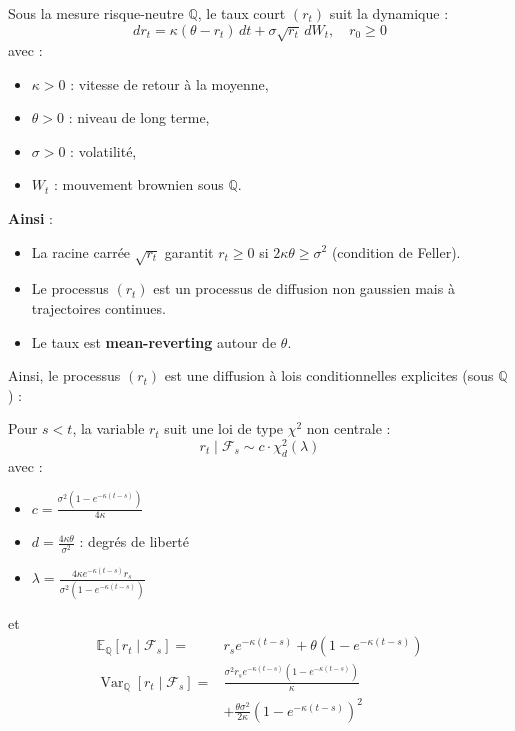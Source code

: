 \begin{f}
	
Sous la mesure risque-neutre $\mathbb{Q}$, le taux court $(r_t)$ suit la dynamique :
\[
dr_t = \kappa(\theta - r_t)\,dt + \sigma \sqrt{r_t}\, dW_t, \quad r_0 \geq 0
\]
avec :
\begin{itemize}[nosep]
	\item $\kappa > 0$ : vitesse de retour à la moyenne,
	\item $\theta > 0$ : niveau de long terme,
	\item $\sigma > 0$ : volatilité,
	\item $W_t$ : mouvement brownien sous $\mathbb{Q}$.
\end{itemize}

\textbf{Ainsi} :
\begin{itemize}
	\item La racine carrée $\sqrt{r_t}$ garantit $r_t \geq 0$ si $2\kappa\theta \geq \sigma^2$ (condition de Feller).
	\item Le processus $(r_t)$ est un processus de diffusion non gaussien mais à trajectoires continues.
	\item Le taux est \textbf{mean-reverting} autour de $\theta$.
\end{itemize}

Ainsi, le processus $(r_t)$ est une diffusion à lois conditionnelles explicites (sous $\mathbb{Q}$) :

Pour $s < t$, la variable $r_t$ suit une loi de type $\chi^2$ non centrale :
\[
r_t \mid \mathcal{F}_s \sim c \cdot \chi^2_{d}(\lambda)
\]
avec :
\begin{itemize}[nosep]
	\item $\displaystyle c = \frac{\sigma^2 (1 - e^{-\kappa (t - s)})}{4\kappa}$
	\item $\displaystyle d = \frac{4\kappa\theta}{\sigma^2}$ : degrés de liberté
	\item $\displaystyle \lambda = \frac{4\kappa e^{-\kappa (t - s)} r_s}{\sigma^2 (1 - e^{-\kappa (t - s)})}$
\end{itemize}

et
\[
\begin{aligned}
	\mathbb{E}_\mathbb{Q}[r_t \mid \mathcal{F}_s] =& r_s e^{-\kappa(t-s)} + \theta (1 - e^{-\kappa(t-s)}) \\
	\operatorname{Var}_\mathbb{Q}[r_t \mid \mathcal{F}_s] =& \frac{\sigma^2 r_s e^{-\kappa(t-s)} (1 - e^{-\kappa(t-s)})}{\kappa} \\
			&+ \frac{\theta \sigma^2}{2\kappa} (1 - e^{-\kappa(t-s)})^2
\end{aligned}
\]

\end{f}
